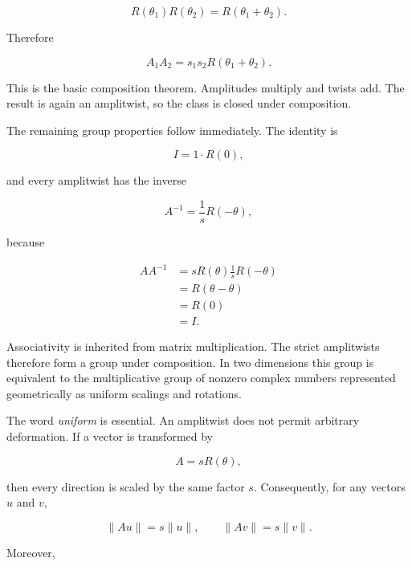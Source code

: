 \documentclass[11pt]{article}
\begin{document}
\begin{equation}
R(\theta_1)R(\theta_2)
=
R(\theta_1+\theta_2).
\end{equation}

Therefore

\begin{equation}
\boxed{
A_1A_2
=
s_1s_2R(\theta_1+\theta_2)
}.
\end{equation}

This is the basic composition theorem. Amplitudes multiply and twists add. The result is again an amplitwist, so the class is closed under composition.

The remaining group properties follow immediately. The identity is

\begin{equation}
I=1\cdot R(0),
\end{equation}

and every amplitwist has the inverse

\begin{equation}
A^{-1}
=
\frac{1}{s}R(-\theta),
\end{equation}

because

\begin{align}
A A^{-1}
&=
sR(\theta)
\frac{1}{s}R(-\theta)\\
&=
R(\theta-\theta)\\
&=
R(0)\\
&=
I.
\end{align}

Associativity is inherited from matrix multiplication. The strict amplitwists therefore form a group under composition. In two dimensions this group is equivalent to the multiplicative group of nonzero complex numbers represented geometrically as uniform scalings and rotations.

The word \emph{uniform} is essential. An amplitwist does not permit arbitrary deformation. If a vector is transformed by

\begin{equation}
A=sR(\theta),
\end{equation}

then every direction is scaled by the same factor $s$. Consequently, for any vectors $u$ and $v$,

\begin{equation}
\|Au\|=s\|u\|,
\qquad
\|Av\|=s\|v\|.
\end{equation}

Moreover,
\end{document}
